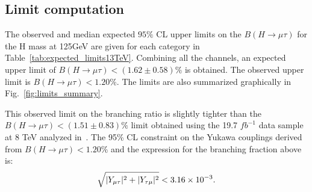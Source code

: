 \documentclass[oneside, letterpaper, oldfontcommands]{memoir}
\DeclarePairedDelimiter{\abs}{\lvert}{\rvert}
\begin{document}
\subsection{Limit computation}

The observed and median expected $95\%$ CL upper limits on the $B(H \rightarrow \mu \tau )$ for the H mass at 125GeV are given for each category
in Table~\ref{tab:expected_limits13TeV}.  Combining all
the channels, an expected upper limit of $B(H \rightarrow \mu \tau )<(1.62 \pm 0.58)\%$ is obtained.
The observed upper limit is $B(H \rightarrow \mu \tau ) < 1.20\%$.
The limits are also  summarized graphically  in
Fig.~\ref{fig:limits_summary}.

This observed limit on the branching ratio is slightly tighter than the $B(H \rightarrow \mu \tau )<(1.51 \pm 0.83)\%$ limit obtained using the 19.7 $fb^{-1}$ data sample at 8 TeV analyzed in~\cite{Khachatryan:2015kon}. The 95\% CL constraint on the Yukawa couplings derived from $B(H \rightarrow \mu \tau )<1.20\%$ and the expression for the branching fraction above is:\begin{equation*}
\sqrt{\abs{Y_{\mu\tau}}^{2}+\abs{Y_{\tau\mu}}^{2}}<3.16\times 10^{-3}.
\end{equation*}
\end{document}
